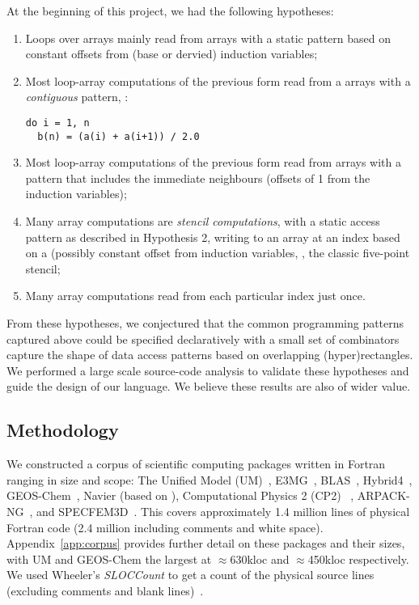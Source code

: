 At the beginning of this project, we had the following hypotheses:
\begin{enumerate}
\item Loops over arrays mainly read from arrays with a static pattern
based on constant offsets from (base or dervied) induction variables;

\item Most loop-array computations of the previous form read
from a arrays with a \emph{contiguous} pattern, \eg{}:
%
\begin{verbatim}
do i = 1, n
  b(n) = (a(i) + a(i+1)) / 2.0
\end{verbatim}
%
\item Most loop-array computations of the previous form read
from arrays with a pattern that includes the immediate
neighbours (offsets of 1 from the induction variables);

\item Many array computations are \emph{stencil computations},
with a static access pattern as described in Hypothesis 2, writing
to an array at an index based on a (possibly constant offset from induction
variables, \eg{}, the classic five-point stencil;

\item Many array computations read from each particular index just once.
\end{enumerate}
%
From these hypotheses, we conjectured that the common programming
patterns captured above could be specified declaratively with a small
set of combinators capture the shape of data access patterns based on
overlapping (hyper)rectangles. We performed a large scale source-code
analysis to validate these hypotheses and guide the design of our
language. We believe these results are also of wider value.

\subsection{Methodology}
%
\noindent
We constructed a corpus of \numPackages{} scientific computing
packages written in Fortran ranging in size and scope: The Unified
Model (UM)~\cite{um}, E3MG~\cite{RePEc:aen:journl:2006se-a12},
BLAS~\cite{blas}, Hybrid4~\cite{GBC:GBC635},
GEOS-Chem~\cite{geos-chem}, Navier (based on
\cite{griebel1997numerical}), Computational Physics 2 (CP2)
~\cite{nicholas2006computational}, ARPACK-NG~\cite{arpackng}, and
SPECFEM3D~\cite{specfem3d}.  This covers
approximately 1.4 million lines of physical Fortran code (2.4 million
including comments and white space).  Appendix~\ref{app:corpus}
provides further detail on these packages and their sizes, with UM and
GEOS-Chem the largest at $\approx$630kloc and $\approx$450kloc respectively. We used
Wheeler's \emph{SLOCCount} to get a count of the physical source lines
(excluding comments and blank lines)~\cite{wheeler2001sloccount}.

